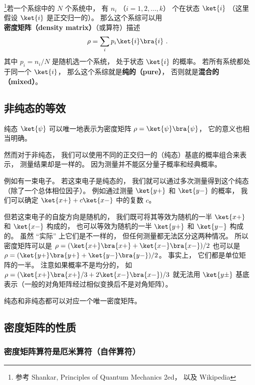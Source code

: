 

\footnote{参考 Shankar, Principles of Quantum Mechanics 2ed， 以及 Wikipedia}若一个系综中的 $N$ 个系统中， 有 $n_i$ （$i = 1,2,\dots,k$） 个在状态 $\ket{i}$ （这里假设 $\ket{i}$ 是正交归一的）。 那么这个系综可以用\textbf{密度矩阵（density matrix）}（或算符）描述
\begin{equation}\label{eq_denMat_1}
\rho = \sum_i p_i\ket{i}\bra{i}   ~.
\end{equation}
其中 $p_i = n_i/N$ 是随机选一个系统， 处于状态 $\ket{i}$ 的概率。 若所有系统都处于同一个 $\ket{i}$， 那么这个系综就是\textbf{纯的（pure）}， 否则就是\textbf{混合的（mixed）}。

\subsection{非纯态的等效}
纯态 $\ket{\psi}$ 可以唯一地表示为密度矩阵 $\rho = \ket{\psi}\bra{\psi}$， 它的意义也相当明确。

然而对于非纯态， 我们可以使用不同的正交归一的（纯态）基底的概率组合来表示， 测量结果却是一样的。 因为测量并不能区分量子概率和经典概率。

例如有一束电子。 若这束电子是纯态的， 我们就可以通过多次测量得到这个纯态（除了一个总体相位因子）。 例如通过测量 $\ket{y+}$ 和 $\ket{y-}$ 的概率， 我们可以确定 $\ket{x+} + c\ket{x-}$ 中的复数 $c$。

但若这束电子的自旋方向是随机的， 我们既可将其等效为随机的一半 $\ket{x+}$ 和 $\ket{x-}$ 构成的， 也可以等效为随机的一半 $\ket{y+}$ 和 $\ket{y-}$ 构成的。 虽然 “实际” 上它们是不一样的， 但任何测量都无法区分这两种情况。 所以密度矩阵可以是 $\rho = (\ket{x+}\bra{x+} + \ket{x-}\bra{x-})/2$ 也可以是 $\rho = (\ket{y+}\bra{y+} + \ket{y-}\bra{y-})/2$。 事实上， 它们都是单位矩阵的一半。 注意如果概率不是均分的， 如 $\rho = (\ket{x+}\bra{x+}/3 + 2\ket{x-}\bra{x-})/3$ 就无法用 $\ket{y\pm}$ 基底表示（一般的对角矩阵经过相似变换后不是对角矩阵）。

纯态和非纯态都可以对应一个唯一密度矩阵。

\subsection{密度矩阵的性质}

\subsubsection{密度矩阵算符是厄米算符（自伴算符）}

